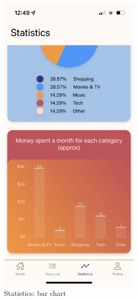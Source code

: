 \documentclass[11pt]{article}
\begin{document}
\begin{figure}[h!]
    \centering
    \begin{minipage}[c]{0.45\textwidth}
        \centering
        \includegraphics[width=0.6\textwidth, clip]{../../assets/smartphone/stat2.PNG}
        \caption{Statistics: bar chart}
        \label{fig:stat2}
    \end{minipage}\hspace{1cm}%
    \begin{minipage}[c]{0.45\textwidth}
        \centering

\end{minipage}
\end{figure}
\end{document}
